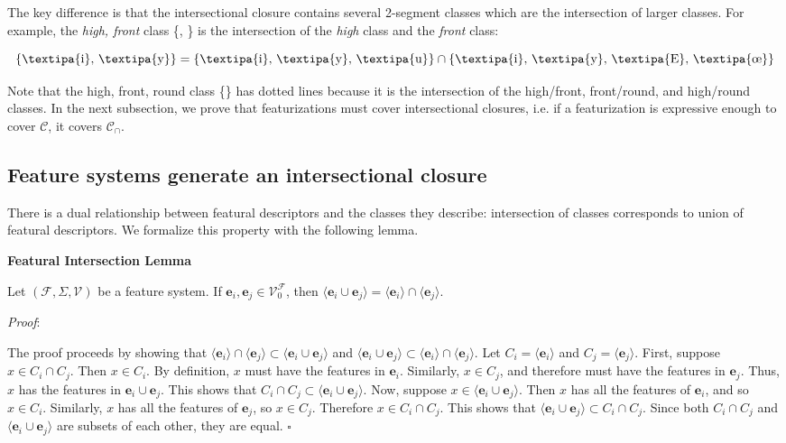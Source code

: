 \documentclass[11pt, oneside]{article}   	%
\begin{document}
The key difference is that the intersectional closure contains several 2-segment classes which are the intersection of larger classes. For example, the \textit{high, front} class \{, \} is the intersection of the \textit{high} class and the \textit{front} class:

$$ \text{\{\textipa{i}, \textipa{y}\}} = \text{\{\textipa{i}, \textipa{y}, \textipa{u}\}} \cap \text{\{\textipa{i}, \textipa{y}, \textipa{E}, \textipa{\oe}\}} $$

\vspace{\baselineskip} \noindent Note that the high, front, round class \{\} has dotted lines because it is the intersection of the high/front, front/round, and high/round classes. In the next subsection, we prove that featurizations must cover intersectional closures, i.e. if a featurization is expressive enough to cover $\mathcal C$, it covers $\mathcal C_\cap$.

\subsection{Feature systems generate an intersectional closure}

There is a dual relationship between featural descriptors and the classes they describe: intersection of classes corresponds to union of featural descriptors. We formalize this property with the following lemma.

\vspace{\baselineskip} \noindent \textbf{Featural Intersection Lemma}

Let $(\mathcal F, \Sigma, \mathcal V)$ be a feature system. If $\mathbf{e}_i, \mathbf{e}_j \in \mathcal V_0^\mathcal F$, then $\langle \mathbf{e}_i \cup \mathbf{e}_j \rangle =  \langle \mathbf{e}_i \rangle \cap \langle \mathbf{e}_j \rangle$.

\vspace{\baselineskip} \noindent \textit{Proof}:

The proof proceeds by showing that $ \langle \mathbf{e}_i \rangle \cap \langle \mathbf{e}_j \rangle \subset \langle \mathbf{e}_i \cup \mathbf{e}_j \rangle$ and $\langle \mathbf{e}_i \cup \mathbf{e}_j \rangle \subset  \langle \mathbf{e}_i \rangle \cap \langle \mathbf{e}_j \rangle$.
Let $C_i = \langle \mathbf{e}_i \rangle$ and $C_j = \langle \mathbf{e}_j \rangle$.
First, suppose $x \in C_i \cap C_j$. Then $x \in C_i$. By definition, $x$ must have the features in $\mathbf{e}_i$.
Similarly, $x \in C_j$, and therefore must have the features in $\mathbf{e}_j$.
Thus, $x$ has the features in $\mathbf{e}_i \cup \mathbf{e}_j$. This shows that $C_i \cap C_j \subset \langle \mathbf{e}_i \cup \mathbf{e}_j \rangle$.
Now, suppose $x \in \langle \mathbf{e}_i \cup \mathbf{e}_j \rangle$. Then $x$ has all the features of $\mathbf{e}_i$, and so $x \in C_i$.
Similarly, $x$ has all the features of $\mathbf{e}_j$, so $x \in C_j$. Therefore $x \in C_i \cap C_j$. This shows that $\langle \mathbf{e}_i \cup \mathbf{e}_j \rangle \subset C_i \cap C_j$.
Since both $C_i \cap C_j$ and $\langle \mathbf{e}_i \cup \mathbf{e}_j \rangle$ are subsets of each other, they are equal.
$\square$
\end{document}

